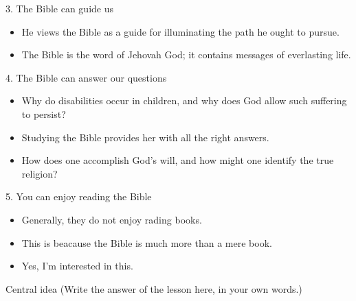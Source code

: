 \begin{campo}{3. The Bible can guide us}
    \begin{itemize}
        \item He views the Bible as a guide for illuminating the path he ought to pursue.
        \item The Bible is the word of Jehovah God; it contains messages of everlasting life. 
    \end{itemize}
\end{campo}
\begin{campo}{4. The Bible can answer our questions}
    \begin{itemize}
        \item Why do disabilities occur in children, and why does God allow such suffering to persist? 
        \item Studying the Bible provides her with all the right answers.
        \item How does one accomplish God's will, and how might one identify the true religion?
    \end{itemize}
\end{campo}

\begin{campo}{5. You can enjoy reading the Bible}
    \begin{itemize}
        \item Generally, they do not enjoy rading books.
        \item This is beacause the Bible is much more than a mere book.
        \item Yes, I'm interested in this.
    \end{itemize}
\end{campo}

\begin{campo}{}
\end{campo}

\begin{campo}{Central idea}
(Write the answer of the lesson here, in your own words.)
\end{campo}

